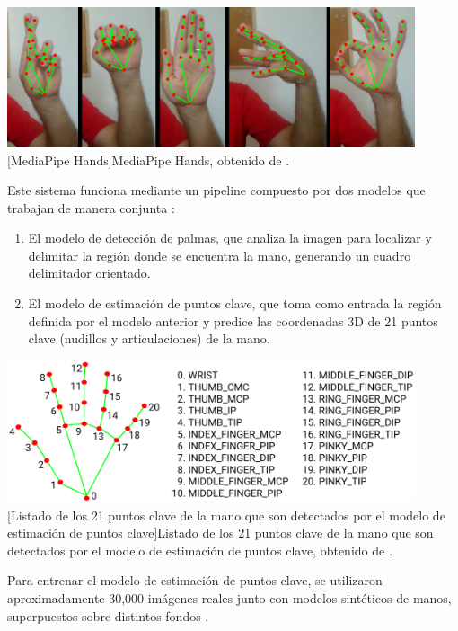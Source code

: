 \begin{center}
    \includegraphics[width=0.9\textwidth]{Images/Cap 2/MediaPipe_Hands.png}
    [MediaPipe Hands]{MediaPipe Hands, obtenido de \cite{ref51}.}  %
\end{center}

Este sistema funciona mediante un pipeline compuesto por dos modelos que trabajan de manera conjunta \cite{ref51}:

\begin{enumerate}
    \item El modelo de detección de palmas, que analiza la imagen para localizar y delimitar la región donde se encuentra la mano, generando un cuadro delimitador orientado.
    \item El modelo de estimación de puntos clave, que toma como entrada la región definida por el modelo anterior y predice las coordenadas 3D de 21 puntos clave (nudillos y articulaciones) de la mano.
\end{enumerate}

\begin{center}
\includegraphics[width=0.9\textwidth]{Images/Cap 2/MediaPipe_hand_landmarks.png}
[Listado de los 21 puntos clave de la mano que son detectados por el modelo de estimación de puntos clave]{Listado de los 21 puntos clave de la mano que son detectados por el modelo de estimación de puntos clave, obtenido de \cite{ref52}.}  %
\end{center}


Para entrenar el modelo de estimación de puntos clave, se utilizaron aproximadamente 30,000 imágenes reales junto con modelos sintéticos de manos, superpuestos sobre distintos fondos \cite{ref52}.\\

